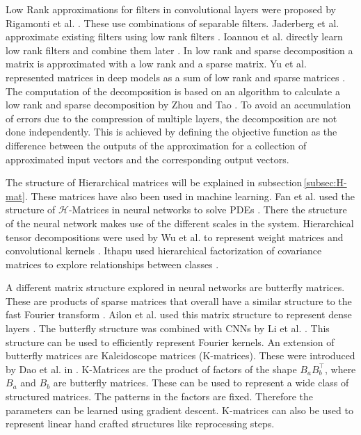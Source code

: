 \documentclass[doctype=mastersthesis,BCOR=15mm,biblatex]{ldvbook}%
\begin{document}
Low Rank approximations for filters in convolutional layers were proposed by Rigamonti et al. \cite{rigamonti_learning_2013}. These use combinations of separable filters. Jaderberg et al. approximate existing filters using low rank filters \cite{jaderberg_speeding_2014}. 
Ioannou et al. directly learn low rank filters and combine them later \cite{ioannou_training_2016}.
In low rank and sparse decomposition a matrix is approximated with a low rank and a sparse matrix. 
Yu et al. represented matrices in deep models as a sum of low rank and sparse matrices \cite{yu_compressing_2017}.
The computation of the decomposition is based on an algorithm to calculate a low rank and sparse decomposition by Zhou and Tao \cite{zhou_greedy_2013}.
To avoid an accumulation of errors due to the compression of multiple layers, the decomposition are not done independently.
This is achieved by defining the objective function as the difference between the outputs of the approximation for a collection of approximated input vectors and the corresponding output vectors.

The structure of Hierarchical matrices will be explained in subsection\,\ref{subsec:H-mat}. These matrices have also been used in machine learning. 
Fan et al. used the structure of $\mathcal{H}$-Matrices in neural networks to solve PDEs \cite{fan_multiscale_2019}. There the structure of the neural network makes use of the different scales in the system.
Hierarchical tensor decompositions were used by Wu et al. to represent weight matrices and convolutional kernels \cite{wu_hybrid_2020}.
Ithapu used hierarchical factorization of covariance matrices to explore relationships between classes \cite{ithapu_decoding_2017}.

A different matrix structure explored in neural networks are butterfly matrices.
These are products of sparse matrices that overall have a similar structure to the fast Fourier transform \cite{li_butterfly_2015,parker_random_1995}. Ailon et al. used this matrix structure to represent dense layers \cite{ailon_sparse_2021}.
The butterfly structure was combined with CNNs by Li et al. \cite{li_butterfly-net_2020}. This structure can be used to efficiently represent Fourier kernels.
An extension of butterfly matrices are Kaleidoscope matrices (K-matrices). These were introduced by Dao et al. in \cite{dao_kaleidoscope_2020}.
K-Matrices are the product of factors of the shape $B_aB_b^\top$, where $B_a$ and $B_b$ are butterfly matrices. These can be used to represent a wide class of structured matrices.
The patterns in the factors are fixed. Therefore the parameters can be learned using gradient descent.
K-matrices can also be used to represent linear hand crafted structures like reprocessing steps. %
\end{document}
